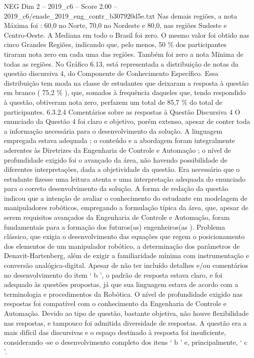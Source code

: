 \begin{textsample}{NEG Dim 2 – 2019\_c6 – Score 2.00 – 2019\_c6/enade\_2019\_eng\_contr\_b307920d5e.txt}
Nas demais regiões, a nota Máxima foi : 60,0 no Norte, 70,0 no Nordeste e 80,0, nas regiões Sudeste e Centro-Oeste.
A Mediana em todo o Brasil foi zero.
O mesmo valor foi obtido nas cinco Grandes Regiões, indicando que, pelo menos, 50 \% dos participantes tiraram nota zero em cada uma das regiões.
Também foi zero a nota Mínima de todas as regiões.
No Gráfico 6.13, está representada a distribuição de notas da questão discursiva 4, do Componente de Conhecimento Específico.
Essa distribuição tem moda na classe de estudantes que deixaram a resposta à questão em branco ( 75,2 \% ), que, somados à frequência daqueles que, tendo respondido à questão, obtiveram nota zero, perfazem um total de 85,7 \% do total de participantes. 6.3.2.4 Comentários sobre as respostas à Questão Discursiva 4 O enunciado da Questão 4 foi claro e objetivo, porém extenso, apesar de conter toda a informação necessária para o desenvolvimento da solução.
A linguagem empregada estava adequada ; o conteúdo e a abordagem foram integralmente aderentes às Diretrizes da Engenharia de Controle e Automação ; o nível de profundidade exigido foi o avançado da área, não havendo possibilidade de diferentes interpretações, dada a objetividade da questão.
Era necessário que o estudante fizesse uma leitura atenta e uma interpretação adequada do enunciado para o correto desenvolvimento da solução.
A forma de redação da questão indicou que a intenção de avaliar o conhecimento do estudante em modelagem de manipuladores robóticos, empregando a formulação típica da área, que, apesar de serem requisitos avançados da Engenharia de Controle e Automação, foram fundamentais para a formação dos futuros(as) engenheiros(as ).
Problema clássico, que exigia o desenvolvimento das equações que regem o posicionamento dos elementos de um manipulador robótico, a determinação dos parâmetros de Denavit-Hartenberg, além de exigir a familiaridade mínima com instrumentação e conversão analógica-digital.
Apesar de não ter incluído detalhes e/ou comentários no desenvolvimento do item ‘ b ’, o padrão de resposta estava claro, e foi adequado às questões propostas, já que sua linguagem estava de acordo com a terminologia e procedimentos da Robótica.
O nível de profundidade exigido nas respostas foi compatível com o conhecimento da Engenharia de Controle e Automação.
Devido ao tipo de questão, bastante objetiva, não houve flexibilidade nas respostas, e tampouco foi admitida diversidade de respostas.
A questão era a mais difícil das discursivas e o espaço destinado à resposta foi insuficiente, considerando -se o desenvolvimento completo dos itens ‘ b ’ e, principalmente, ‘ c ’.

\end{textsample}
